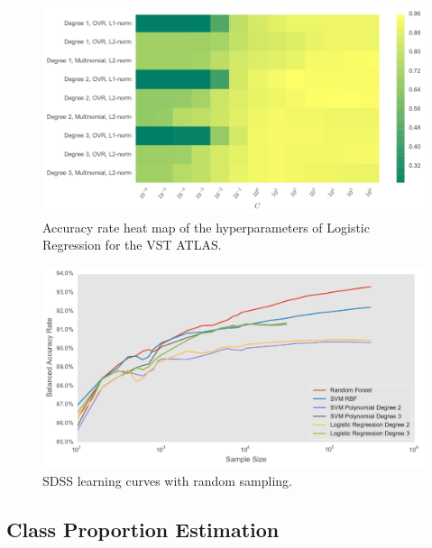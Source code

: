 \begin{figure}[tbp]
	\centering
	\includegraphics[width=\textwidth]{figures/heat_vstatlas_vgridsearch_logistic}
	\caption{Accuracy rate heat map of the hyperparameters of Logistic Regression for the VST ATLAS.}
	\label{fig:vst_heat_logistic}
\end{figure}


\begin{figure}[tbp]
	\centering
	\includegraphics[width=\textwidth]{figures/learning_curves}
	\caption{SDSS learning curves with random sampling.}
	\label{fig:sdss_learning}
\end{figure}





\subsection{Class Proportion Estimation}

